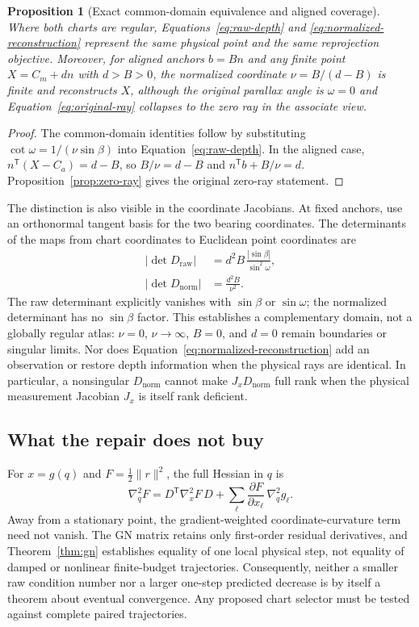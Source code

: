\documentclass[11pt,a4paper]{article}
\newtheorem{proposition}[theorem]{Proposition}
\theoremstyle{definition}
\theoremstyle{remark}
\newcommand{\T}{\mathsf{T}}
\begin{document}
\begin{proposition}[Exact common-domain equivalence and aligned coverage]
\label{prop:normalized-chart}
Where both charts are regular, Equations~\eqref{eq:raw-depth} and \eqref{eq:normalized-reconstruction} represent the same physical point and the same reprojection objective. Moreover, for aligned anchors $b=Bn$ and any finite point $X=C_m+dn$ with $d>B>0$, the normalized coordinate $\nu=B/(d-B)$ is finite and reconstructs $X$, although the original parallax angle is $\omega=0$ and Equation~\eqref{eq:original-ray} collapses to the zero ray in the associate view.
\end{proposition}
\begin{proof}
The common-domain identities follow by substituting $\cot\omega=1/(\nu\sin\beta)$ into Equation~\eqref{eq:raw-depth}. In the aligned case, $n^\T(X-C_a)=d-B$, so $B/\nu=d-B$ and $n^\T b+B/\nu=d$. Proposition~\ref{prop:zero-ray} gives the original zero-ray statement.
\end{proof}

The distinction is also visible in the coordinate Jacobians. At fixed anchors, use an orthonormal tangent basis for the two bearing coordinates. The determinants of the maps from chart coordinates to Euclidean point coordinates are
\begin{align}
  |\det D_{\mathrm{raw}}|
    &=d^2B\,\frac{|\sin\beta|}{\sin^2\omega},\\
  |\det D_{\mathrm{norm}}|
    &=\frac{d^2B}{\nu^2} .
  \label{eq:chart-determinants}
\end{align}
The raw determinant explicitly vanishes with $\sin\beta$ or $\sin\omega$; the normalized determinant has no $\sin\beta$ factor. This establishes a complementary domain, not a globally regular atlas: $\nu=0$, $\nu\to\infty$, $B=0$, and $d=0$ remain boundaries or singular limits. Nor does Equation~\eqref{eq:normalized-reconstruction} add an observation or restore depth information when the physical rays are identical. In particular, a nonsingular $D_{\mathrm{norm}}$ cannot make $J_xD_{\mathrm{norm}}$ full rank when the physical measurement Jacobian $J_x$ is itself rank deficient.

\subsection{What the repair does not buy}
For $x=g(q)$ and $F=\tfrac12\|r\|^2$, the full Hessian in $q$ is
\begin{equation}
  \nabla_q^2F
  =D^\T\nabla_x^2F\,D
  +\sum_{\ell}\frac{\partial F}{\partial x_\ell}\,\nabla_q^2g_\ell .
  \label{eq:full-hessian}
\end{equation}
Away from a stationary point, the gradient-weighted coordinate-curvature term need not vanish. The GN matrix retains only first-order residual derivatives, and Theorem~\ref{thm:gn} establishes equality of one local physical step, not equality of damped or nonlinear finite-budget trajectories. Consequently, neither a smaller raw condition number nor a larger one-step predicted decrease is by itself a theorem about eventual convergence. Any proposed chart selector must be tested against complete paired trajectories.
\end{document}
